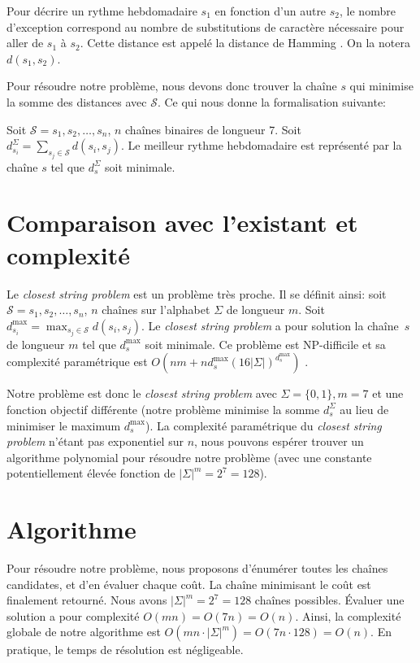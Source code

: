 \documentclass{roadef}
\def\S{\mathcal{S}}
\begin{document}
Pour décrire un rythme hebdomadaire $s_1$ en fonction d'un autre
$s_2$, le nombre d'exception correspond au nombre de substitutions de
caractère nécessaire pour aller de $s_1$ à $s_2$. Cette distance est
appelé la distance de Hamming \cite{hamming1950error}. On la notera
$d(s_1, s_2)$.

Pour résoudre notre problème, nous devons donc trouver la chaîne $s$
qui minimise la somme des distances avec $\S$. Ce qui nous donne la
formalisation suivante:

Soit $\S = s_1, s_2, \ldots, s_n$, $n$ chaînes binaires de
longueur 7. Soit
\begin{math}
  d^\Sigma_{s_i} = \sum_{s_j\in\S} d(s_i, s_j)
\end{math}.
Le meilleur rythme hebdomadaire est représenté par la chaîne $s$ tel
que $d^\Sigma_s$ soit minimale.

\section{Comparaison avec l'existant et complexité}

Le \emph{closest string problem} est un problème très proche.  Il se
définit ainsi: soit $\S = s_1, s_2, \ldots, s_n$, $n$ chaînes sur
l'alphabet $\Sigma$ de longueur $m$.  Soit $d^{\max}_{s_i} =
\max_{s_j\in\S} d(s_i, s_j)$. Le \emph{closest string problem} a pour
solution la chaîne~$s$ de longueur $m$ tel que $d^{\max}_s$ soit
minimale.  Ce problème est NP-difficile
\cite{lanctot2003distinguishing} et sa complexité paramétrique est
\begin{math}
  O(nm + nd^{\max}_s(16|\Sigma|)^{d^{\max}_s})
\end{math}
\cite{ma2008more}.

Notre problème est donc le \emph{closest string problem} avec $\Sigma
= \{0, 1\}, m = 7$ et une fonction objectif différente (notre problème
minimise la somme $d^\Sigma_s$ au lieu de minimiser le maximum
$d^{\max}_s$). La complexité paramétrique du \emph{closest string
  problem} n'étant pas exponentiel sur $n$, nous pouvons espérer
trouver un algorithme polynomial pour résoudre notre problème (avec
une constante potentiellement élevée fonction de $|\Sigma|^m = 2^7 =
128$).

\section{Algorithme}

Pour résoudre notre problème, nous proposons d'énumérer toutes les
chaînes candidates, et d'en évaluer chaque coût.  La chaîne minimisant
le coût est finalement retourné. Nous avons $|\Sigma|^m = 2^7 = 128$
chaînes possibles. Évaluer une solution a pour complexité $O(mn) =
O(7n) = O(n)$. Ainsi, la complexité globale de notre algorithme est
$O(mn\cdot|\Sigma|^m) = O(7n\cdot128) = O(n)$. En pratique, le temps
de résolution est négligeable.
\end{document}
